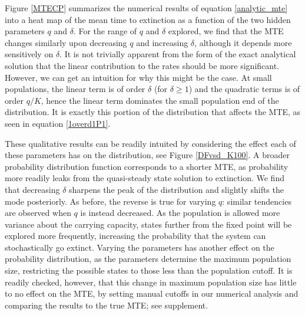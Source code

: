 \documentclass[a4paper,10pt]{article}
\numberwithin{equation}{section} %
\begin{document}
Figure \ref{MTECP} summarizes the numerical results of equation \ref{analytic_mte} into a heat map of the mean time to extinction as a function of the two hidden parameters $q$ and $\delta$.
For the range of $q$ and $\delta$ explored, we find that the MTE changes similarly upon decreasing $q$ and increasing $\delta$, although it depends more sensitively on $\delta$. 
It is not trivially apparent from the form of the exact analytical solution that the linear contribution to the rates should be more significant. %
However, we can get an intuition for why this might be the case. 
At small populations, the linear term is of order $\delta$ (for $\delta \geq 1$) and the quadratic terms is of order $q/K$, hence the linear term dominates the small population end of the distribution. 
It is exactly this portion of the distribution that affects the MTE, as seen in equation \ref{1overd1P1}. 

These qualitative results can be readily intuited by considering the effect each of these parameters has on the distribution, see Figure \ref{DFvsd_K100}.
A broader probability distribution function corresponds to a shorter MTE, as probability more readily leaks from the quasi-steady state solution to extinction.
We find that decreasing $\delta$ sharpens the peak of the distribution and slightly shifts the mode posteriorly. 
As before, the reverse is true for varying $q$: similar tendencies are observed when $q$ is instead decreased.
As the population is allowed more variance about the carrying capacity, states further from the fixed point will be explored more frequently, increasing the probability that the system can stochastically go extinct. 
Varying the parameters has another effect on the probability distribution, as the parameters determine the maximum population size, restricting the possible states to those less than the population cutoff. 
It is readily checked, however, that this change in maximum population size has little to no effect on the MTE, by setting manual cutoffs in our numerical analysis and comparing the results to the true MTE; see supplement. 
\end{document}
